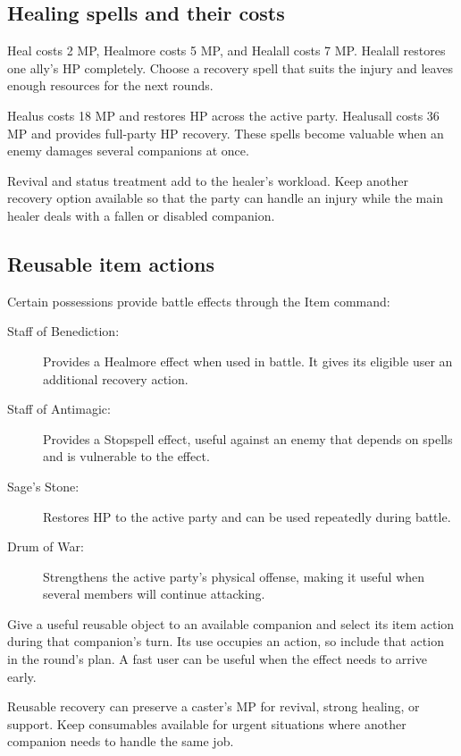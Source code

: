 \subsection*{Healing spells and their costs}

Heal costs 2 MP, Healmore costs 5 MP, and Healall costs 7 MP. Healall restores
one ally's HP completely. Choose a recovery spell that suits the injury
and leaves enough resources for the next rounds.

Healus costs 18 MP and restores HP across the active party. Healusall costs
36 MP and provides full-party HP recovery. These spells become valuable
when an enemy damages several companions at once.

Revival and status treatment add to the healer's workload. Keep another
recovery option available so that the party can handle an injury while
the main healer deals with a fallen or disabled companion.

\subsection*{Reusable item actions}

Certain possessions provide battle effects through the Item command:
\begin{description}
  \item[Staff of Benediction:] Provides a Healmore effect when used in
    battle. It gives its eligible user an additional recovery action.
  \item[Staff of Antimagic:] Provides a Stopspell effect, useful against
    an enemy that depends on spells and is vulnerable to the effect.
  \item[Sage's Stone:] Restores HP to the active party and can be used
    repeatedly during battle.
  \item[Drum of War:] Strengthens the active party's physical offense,
    making it useful when several members will continue attacking.
\end{description}

Give a useful reusable object to an available companion and select its
item action during that companion's turn. Its use occupies an action,
so include that action in the round's plan. A fast user can be useful
when the effect needs to arrive early.

Reusable recovery can preserve a caster's MP for revival, strong healing,
or support. Keep consumables available for urgent situations where another
companion needs to handle the same job.

